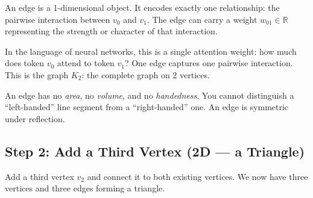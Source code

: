 An edge is a 1-dimensional object. It encodes exactly one relationship: the
pairwise interaction between $v_0$ and $v_1$. The edge can carry a weight
$w_{01} \in \mathbb{R}$ representing the strength or character of that interaction.

In the language of neural networks, this is a single attention weight: how much
does token $v_0$ attend to token $v_1$? One edge captures one pairwise interaction.
This is the graph $K_2$: the complete graph on 2 vertices.

\begin{remark}
An edge has no \emph{area}, no \emph{volume}, and no \emph{handedness}. You
cannot distinguish a ``left-handed'' line segment from a ``right-handed'' one.
An edge is symmetric under reflection.
\end{remark}

\subsection{Step 2: Add a Third Vertex (2D --- a Triangle)}
\label{sec:step2-triangle}

Add a third vertex $v_2$ and connect it to both existing vertices. We now have
three vertices and three edges forming a triangle.

\begin{center}
\end{center}

